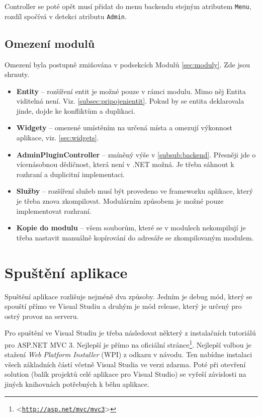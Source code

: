 \documentclass[11pt,twoside,a4paper]{book}
\let\oldUrl\url
\renewcommand\url[1]{<\texttt{\oldUrl{#1}}>}
\begin{document}
Controller se poté opět musí přidat do menu backendu stejným atributem \texttt{Menu}, rozdíl spočívá v detekci atributu \texttt{Admin}. 

\subsection{Omezení modulů}

Omezení byla postupně zmiňována v podsekcích Modulů \ref{sec:moduly}. Zde jsou shrnuty.

\begin{itemize}
\item \textbf{Entity} -- rozšíření entit je možné pouze v rámci modulu. Mimo něj Entita viditelná není. Viz. \ref{subsec:pripojenientit}. Pokud by se entita deklarovala jinde, dojde ke konfliktům a duplikaci.
\item \textbf{Widgety} -- omezené umístěním na určená místa a omezují výkonnost aplikace, viz. \ref{sec:widgets}.
\item \textbf{AdminPluginController} -- zmíněný výše v \ref{subsub:backend}. Přesněji jde o vícenásobnou dědičnost, která není v .NET možná. Je třeba sáhnout k rozhraní a duplicitní implementaci.
\item \textbf{Služby} -- rozšíření služeb musí být provedeno ve frameworku aplikace, který je třeba znova zkompilovat. Modulárním způsobem je možné pouze implementovat rozhraní.
\item \textbf{Kopie do modulu} -- všem souborům, které se v modulech nekompilují je třeba nastavit manuálně kopírování do adresáře se zkompilovaným modulem.
\end{itemize}



\section{Spuštění aplikace}
\label{sec:spusteni}
Spuštění aplikace rozlišuje nejméně dva způsoby. Jedním je debug mód, který se spouští přímo ve Visual Studiu a druhým je mód release, který je určený pro ostrý provoz na serveru.

Pro spuštění ve Visual Studiu je třeba následovat některý z instalačních tutoriálú pro ASP.NET MVC 3. Nejlepší je přímo na oficiální stránce\footnote{\url{http://asp.net/mvc/mvc3}}. Nejlepší volbou je stažení \textit{Web Platform Installer} (WPI) z odkazu v návodu. Ten nabídne instalaci všech základních částí včetně Visual Studia ve verzi zdarma. Poté při otevření \textsf{solution} (balík projektů celé aplikace pro Visual Studio) se vyřeší závislosti na jiných knihovnách potřebných k běhu aplikace.
\end{document}
